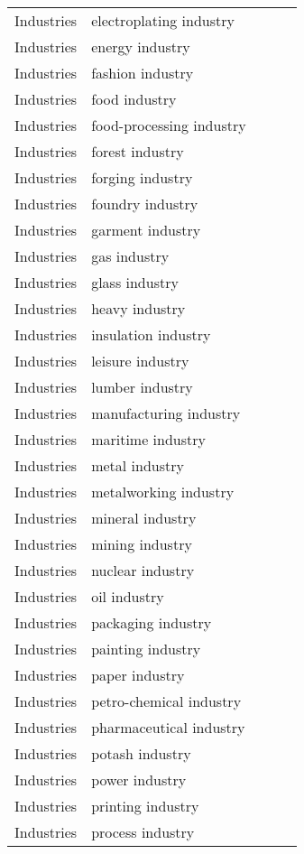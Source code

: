 {\begin{longtable}{lp{3cm}>{\raggedright\arraybackslash}p{6cm}>{\raggedright\arraybackslash}p{6cm}>{\raggedright\arraybackslash}p{8cm}}
Industries & electroplating industry &  &  & \\
Industries & energy industry &  &  & \\
Industries & fashion industry &  &  & \\
Industries & food industry &  &  & \\
Industries & food-processing industry &  &  & \\
Industries & forest industry &  &  & \\
Industries & forging industry &  &  & \\
Industries & foundry industry &  &  & \\
Industries & garment industry &  &  & \\
Industries & gas industry &  &  & \\
Industries & glass industry &  &  & \\
Industries & heavy industry &  &  & \\
Industries & insulation industry &  &  & \\
Industries & leisure industry &  &  & \\
Industries & lumber industry &  &  & \\
Industries & manufacturing industry &  &  & \\
Industries & maritime industry &  &  & \\
Industries & metal industry &  &  & \\
Industries & metalworking industry &  &  & \\
Industries & mineral industry &  &  & \\
Industries & mining industry &  &  & \\
Industries & nuclear industry &  &  & \\
Industries & oil industry &  &  & \\
Industries & packaging industry &  &  & \\
Industries & painting industry &  &  & \\
Industries & paper industry &  &  & \\
Industries & petro-chemical industry &  &  & \\
Industries & pharmaceutical industry &  &  & \\
Industries & potash industry &  &  & \\
Industries & power industry &  &  & \\
Industries & printing industry &  &  & \\
Industries & process industry &  &  & \\

\end{longtable}}
